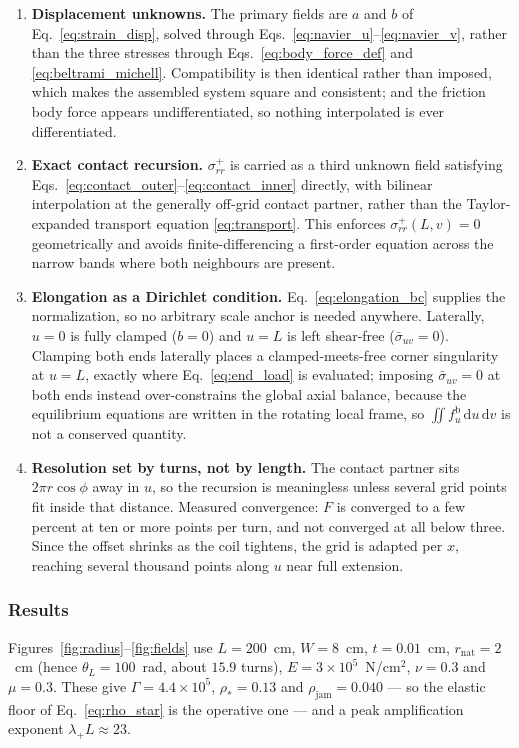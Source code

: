 \documentclass[11pt]{article}
\begin{document}
\begin{enumerate}
\item \textbf{Displacement unknowns.} The primary fields are $a$ and $b$ of
  Eq.~\eqref{eq:strain_disp}, solved through
  Eqs.~\eqref{eq:navier_u}--\eqref{eq:navier_v}, rather than the three stresses
  through Eqs.~\eqref{eq:body_force_def} and \eqref{eq:beltrami_michell}.
  Compatibility is then identical rather than imposed, which makes the assembled
  system square and consistent; and the friction body force appears
  undifferentiated, so nothing interpolated is ever differentiated.
\item \textbf{Exact contact recursion.} $\sigma_{rr}^{+}$ is carried as a third
  unknown field satisfying
  Eqs.~\eqref{eq:contact_outer}--\eqref{eq:contact_inner} directly, with bilinear
  interpolation at the generally off-grid contact partner, rather than the
  Taylor-expanded transport equation \eqref{eq:transport}. This enforces
  $\sigma_{rr}^{+}(L,v) = 0$ geometrically and avoids finite-differencing a
  first-order equation across the narrow bands where both neighbours are present.
\item \textbf{Elongation as a Dirichlet condition.} Eq.~\eqref{eq:elongation_bc}
  supplies the normalization, so no arbitrary scale anchor is needed anywhere.
  Laterally, $u = 0$ is fully clamped ($b = 0$) and $u = L$ is left shear-free
  ($\bar\sigma_{uv} = 0$). Clamping both ends laterally places a
  clamped-meets-free corner singularity at $u = L$, exactly where
  Eq.~\eqref{eq:end_load} is evaluated; imposing $\bar\sigma_{uv} = 0$ at both
  ends instead over-constrains the global axial balance, because the equilibrium
  equations are written in the rotating local frame, so
  $\iint f_u^{\mathrm b}\,\mathrm d u\,\mathrm d v$ is not a conserved quantity.
\item \textbf{Resolution set by turns, not by length.} The contact partner sits
  $2\pi r\cos\phi$ away in $u$, so the recursion is meaningless unless several
  grid points fit inside that distance. Measured convergence: $F$ is converged to
  a few percent at ten or more points per turn, and not converged at all below
  three. Since the offset shrinks as the coil tightens, the grid is adapted per
  $x$, reaching several thousand points along $u$ near full extension.
\end{enumerate}

\subsubsection*{Results}\label{sec:numerical_results}
Figures~\ref{fig:radius}--\ref{fig:fields} use $L = 200$~cm, $W = 8$~cm,
$t = 0.01$~cm, $r_{\mathrm{nat}} = 2$~cm (hence $\theta_L = 100$~rad, about
$15.9$ turns), $E = 3\times10^{5}$~N/cm$^{2}$, $\nu = 0.3$ and $\mu = 0.3$. These
give $\Gamma = 4.4\times10^{5}$, $\rho_* = 0.13$ and
$\rho_{\mathrm{jam}} = 0.040$ --- so the elastic floor of
Eq.~\eqref{eq:rho_star} is the operative one --- and a peak amplification
exponent $\lambda_{+}L \approx 23$.
\end{document}
